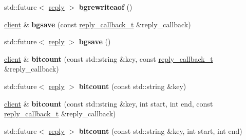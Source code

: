 \begin{DoxyCompactItemize}
\item 
\mbox{\label{classcpp__redis_1_1client_a82959607f4cbe9dac195d27621a9cc64}} 
std\+::future$<$ \hyperlink{classcpp__redis_1_1reply}{reply} $>$ {\bfseries bgrewriteaof} ()
\item 
\mbox{\label{classcpp__redis_1_1client_a102a4f3572072a5bc26681082ad16a2b}} 
\hyperlink{classcpp__redis_1_1client}{client} \& {\bfseries bgsave} (const \hyperlink{classcpp__redis_1_1client_a061a1140d36d2eaeda82b09a0bb3f9f2}{reply\+\_\+callback\+\_\+t} \&reply\+\_\+callback)
\item 
\mbox{\label{classcpp__redis_1_1client_a632ef40c52f46eb4948768006adfead5}} 
std\+::future$<$ \hyperlink{classcpp__redis_1_1reply}{reply} $>$ {\bfseries bgsave} ()
\item 
\mbox{\label{classcpp__redis_1_1client_aa6c9c15d8676a1cee3d8409ab898a049}} 
\hyperlink{classcpp__redis_1_1client}{client} \& {\bfseries bitcount} (const std\+::string \&key, const \hyperlink{classcpp__redis_1_1client_a061a1140d36d2eaeda82b09a0bb3f9f2}{reply\+\_\+callback\+\_\+t} \&reply\+\_\+callback)
\item 
\mbox{\label{classcpp__redis_1_1client_ac667b96661726874bc237c84de1ddd89}} 
std\+::future$<$ \hyperlink{classcpp__redis_1_1reply}{reply} $>$ {\bfseries bitcount} (const std\+::string \&key)
\item 
\mbox{\label{classcpp__redis_1_1client_ac631a06c8b69a2f1b4de3aabc19d68e2}} 
\hyperlink{classcpp__redis_1_1client}{client} \& {\bfseries bitcount} (const std\+::string \&key, int start, int end, const \hyperlink{classcpp__redis_1_1client_a061a1140d36d2eaeda82b09a0bb3f9f2}{reply\+\_\+callback\+\_\+t} \&reply\+\_\+callback)
\item 
\mbox{\label{classcpp__redis_1_1client_af2d2dc1c19d735e84d8e2725fb98dbda}} 
std\+::future$<$ \hyperlink{classcpp__redis_1_1reply}{reply} $>$ {\bfseries bitcount} (const std\+::string \&key, int start, int end)
\item 
\mbox{\label{classcpp__redis_1_1client_a9289b0f474073f59509b565d93c69506}} 

\end{DoxyCompactItemize}
